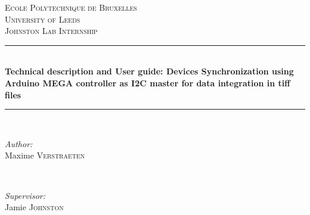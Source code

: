 \documentclass[a4paper]{article}
\begin{document}
\begin{titlepage}

\newcommand{\HRule}{\rule{\linewidth}{0.5mm}} %

\center %
 

\textsc{\LARGE Ecole Polytechnique de Bruxelles}\\[1.5cm] %
\textsc{\LARGE University of Leeds}\\[1.5cm]
\textsc{\large Johnston Lab Internship}\\[0.5cm] %


\HRule \\[0.4cm]
{ \huge \bfseries Technical description and User guide: Devices Synchronization using Arduino MEGA controller as I2C master for data integration in tiff files}\\[0.4cm] %
\HRule \\[1.5cm]
 

\begin{minipage}{0.4\textwidth}
\begin{flushleft} \large
\emph{Author:}\\
Maxime \textsc{Verstraeten} %
\end{flushleft}
\end{minipage}
~
\begin{minipage}{0.4\textwidth}
\begin{flushright} \large
\emph{Supervisor:} \\
Jamie \textsc{Johnston}\\[0.3cm] %
\end{flushright}
\end{minipage}\\[2cm]


\end{titlepage}
\end{document}
